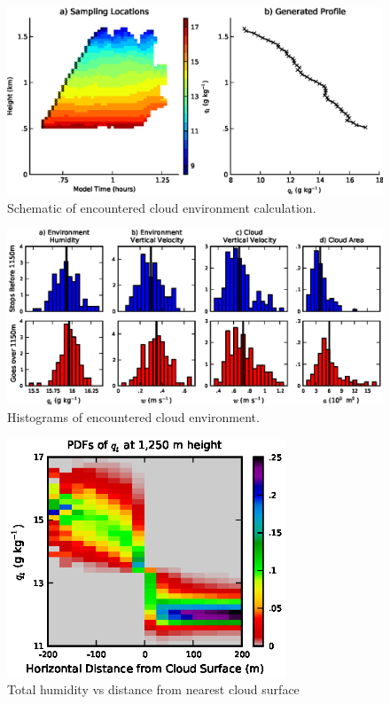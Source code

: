 \documentclass[acp]{copernicus}
\begin{document}
\begin{figure}[t]
\vspace*{2mm}
\begin{center}
\includegraphics[width=\textwidth]{./figures/cloud_environment_schematic}
\end{center}
\caption{Schematic of encountered cloud environment calculation.}
\label{fig:cloud_environment_schematic}
\end{figure}

\begin{figure}[t]
\vspace*{2mm}
\begin{center}
\includegraphics[width=\textwidth]{./figures/cloud_environment_histograms}
\end{center}
\caption{Histograms of encountered cloud environment.}
\label{fig:cloud_environment_histograms}
\end{figure}

\begin{figure}[t]
\vspace*{2mm}
\begin{center}
\includegraphics[width=8.3cm]{./figures/qt_vs_dist}
\end{center}
\caption{Total humidity vs distance from nearest cloud surface}
\label{fig:qt_vs_dist}
\end{figure}
\end{document}
